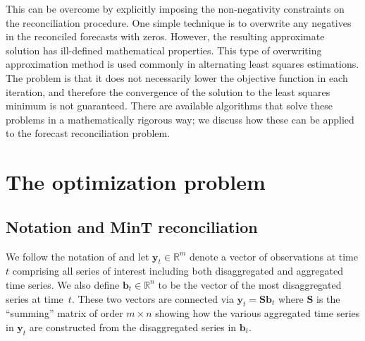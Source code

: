 \documentclass[11pt]{article}
\newcommand{\0}{\phantom{0}}
\begin{document}
This can be overcome by explicitly imposing the non-negativity constraints on the reconciliation procedure. One simple technique is to overwrite any negatives in the reconciled forecasts with zeros. However, the resulting approximate solution has ill-defined mathematical properties. This type of overwriting approximation method is used commonly in alternating least squares estimations. The problem is that it does not necessarily lower the objective function in each iteration, and therefore the convergence of the solution to the least squares minimum is not guaranteed. There are available algorithms that solve these problems in a mathematically rigorous way; we discuss how these can be applied to the forecast reconciliation problem. 


\section{The optimization problem}

\subsection{Notation and MinT reconciliation}

We follow the notation of \citet{Wick2018} and let $\bm{y}_t \in \mathbb{R}^m$ denote a vector of observations at time $t$ comprising all series of interest including both disaggregated and aggregated time series. We also define $\bm{b}_t \in \mathbb{R}^n$ to be the vector of the most disaggregated series at time~$t$. These two vectors are connected via $\bm{y}_t=\bm{S}\bm{b}_t$ where $\bm{S}$ is the ``summing'' matrix of order $m \times n$ showing how the various aggregated time series in $\bm{y}_t$ are constructed from the disaggregated series in $\bm{b}_t$.
\end{document}
